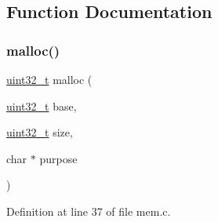 \subsection{Function Documentation}
\mbox{\label{a00116_a9087e3504e5973deee6f3561705978c7_a9087e3504e5973deee6f3561705978c7}} 
\subsubsection{\texorpdfstring{malloc()}{malloc()}}
{\footnotesize\ttfamily \hyperlink{a00101_a435d1572bf3f880d55459d9805097f62_a435d1572bf3f880d55459d9805097f62}{uint32\+\_\+t} malloc (\begin{DoxyParamCaption}\item[{\hyperlink{a00101_a435d1572bf3f880d55459d9805097f62_a435d1572bf3f880d55459d9805097f62}{uint32\+\_\+t}}]{base,  }\item[{\hyperlink{a00101_a435d1572bf3f880d55459d9805097f62_a435d1572bf3f880d55459d9805097f62}{uint32\+\_\+t}}]{size,  }\item[{char $\ast$}]{purpose }\end{DoxyParamCaption})}



Definition at line 37 of file mem.\+c.


